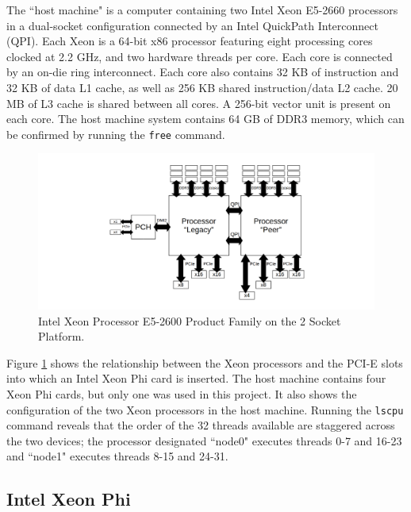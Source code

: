 \documentclass{report}
\begin{document}
The ``host machine" is a computer containing two Intel Xeon E5-2660 processors in a dual-socket configuration connected by an Intel QuickPath Interconnect (QPI). Each Xeon is a 64-bit x86 processor featuring eight processing cores clocked at 2.2 GHz, and two hardware threads per core. Each core is connected by an on-die ring interconnect. Each core also contains 32 KB of instruction and 32 KB of data L1 cache, as well as 256 KB shared instruction/data L2 cache\cite{xeondatasheet}. 20 MB of L3 cache is shared between all cores\cite{xeonoverview}. A 256-bit vector unit is present on each core\cite{xeonoverview}. The host machine system contains 64 GB of DDR3 memory, which can be confirmed by running the \verb!free! command.
\noindent
\begin{figure}
	\includegraphics[width=\linewidth]{../diagrams/xeon}
	\caption{Intel Xeon Processor E5-2600 Product Family on the 2 Socket Platform\cite{xeondatasheet}.}
	\label{Fig:xeon}
\end{figure}

Figure \ref{Fig:xeon} shows the relationship between the Xeon processors and the PCI-E slots into which an Intel Xeon Phi card is inserted. The host machine contains four Xeon Phi cards, but only one was used in this project. It also shows the configuration of the two Xeon processors in the host machine. Running the \verb!lscpu! command reveals that the order of the 32 threads available are staggered across the two devices; the processor designated ``node0" executes threads 0-7 and 16-23 and ``node1" executes threads 8-15 and 24-31.

\subsection{Intel Xeon Phi} \label{Sec:intelxeonphi}
\end{document}
